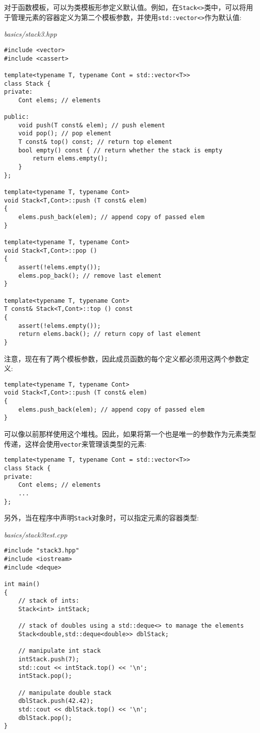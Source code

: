 对于函数模板，可以为类模板形参定义默认值。例如，在\texttt{Stack<>}类中，可以将用于管理元素的容器定义为第二个模板参数，并使用\texttt{std::vector<>}作为默认值:

\noindent
\textit{basics/stack3.hpp}
\begin{lstlisting}[style=styleCXX]
#include <vector>
#include <cassert>

template<typename T, typename Cont = std::vector<T>>
class Stack {
private:
	Cont elems; // elements
	
public:
	void push(T const& elem); // push element
	void pop(); // pop element
	T const& top() const; // return top element
	bool empty() const { // return whether the stack is empty
		return elems.empty();
	}
};

template<typename T, typename Cont>
void Stack<T,Cont>::push (T const& elem)
{
	elems.push_back(elem); // append copy of passed elem
}

template<typename T, typename Cont>
void Stack<T,Cont>::pop ()
{
	assert(!elems.empty());
	elems.pop_back(); // remove last element
}

template<typename T, typename Cont>
T const& Stack<T,Cont>::top () const
{
	assert(!elems.empty());
	return elems.back(); // return copy of last element
}
\end{lstlisting}

注意，现在有了两个模板参数，因此成员函数的每个定义都必须用这两个参数定义:

\begin{lstlisting}[style=styleCXX]
template<typename T, typename Cont>
void Stack<T,Cont>::push (T const& elem)
{
	elems.push_back(elem); // append copy of passed elem
}
\end{lstlisting}

可以像以前那样使用这个堆栈。因此，如果将第一个也是唯一的参数作为元素类型传递，这样会使用\texttt{vector}来管理该类型的元素:

\begin{lstlisting}[style=styleCXX]
template<typename T, typename Cont = std::vector<T>>
class Stack {
private:
	Cont elems; // elements
	...
};
\end{lstlisting}

另外，当在程序中声明\texttt{Stack}对象时，可以指定元素的容器类型:

\noindent
\textit{basics/stack3test.cpp}
\begin{lstlisting}[style=styleCXX]
#include "stack3.hpp"
#include <iostream>
#include <deque>

int main()
{
	// stack of ints:
	Stack<int> intStack;

	// stack of doubles using a std::deque<> to manage the elements
	Stack<double,std::deque<double>> dblStack;

	// manipulate int stack
	intStack.push(7);
	std::cout << intStack.top() << '\n';
	intStack.pop();

	// manipulate double stack
	dblStack.push(42.42);
	std::cout << dblStack.top() << '\n';
	dblStack.pop();
}
\end{lstlisting}

